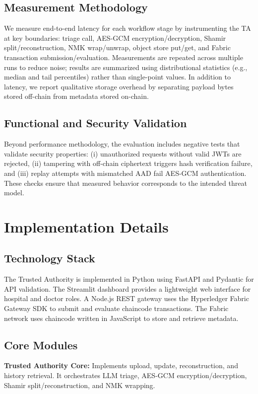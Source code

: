 \documentclass{IEEEtran}
\begin{document}
\subsection{Measurement Methodology}
We measure end-to-end latency for each workflow stage by instrumenting the TA at key boundaries: triage call, AES-GCM encryption/decryption, Shamir split/reconstruction, NMK wrap/unwrap, object store put/get, and Fabric transaction submission/evaluation. Measurements are repeated across multiple runs to reduce noise; results are summarized using distributional statistics (e.g., median and tail percentiles) rather than single-point values. In addition to latency, we report qualitative storage overhead by separating payload bytes stored off-chain from metadata stored on-chain.

\subsection{Functional and Security Validation}
Beyond performance methodology, the evaluation includes negative tests that validate security properties: (i) unauthorized requests without valid JWTs are rejected, (ii) tampering with off-chain ciphertext triggers hash verification failure, and (iii) replay attempts with mismatched AAD fail AES-GCM authentication. These checks ensure that measured behavior corresponds to the intended threat model.

\section{Implementation Details}
\label{sec:implementation}

\subsection{Technology Stack}
The Trusted Authority is implemented in Python using FastAPI and Pydantic for API validation. The Streamlit dashboard provides a lightweight web interface for hospital and doctor roles. A Node.js REST gateway uses the Hyperledger Fabric Gateway SDK to submit and evaluate chaincode transactions. The Fabric network uses chaincode written in JavaScript to store and retrieve metadata.

\subsection{Core Modules}
\textbf{Trusted Authority Core:} Implements upload, update, reconstruction, and history retrieval. It orchestrates LLM triage, AES-GCM encryption/decryption, Shamir split/reconstruction, and NMK wrapping.
\end{document}
